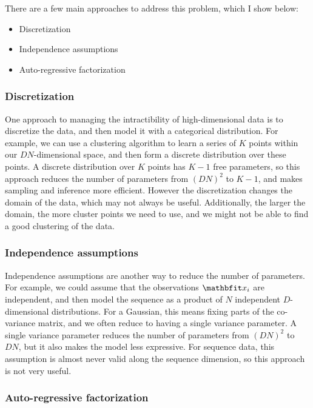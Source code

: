 There are a few main approaches to address this problem, which I show below:

\begin{itemize}
    \item Discretization
    \item Independence assumptions
    \item Auto-regressive factorization
\end{itemize}

\subsubsection{Discretization}

One approach to managing the intractibility of high-dimensional data is to discretize the data, and then model it with a categorical distribution. For example, we can use a clustering algorithm to learn a series of $K$ points within our $DN$-dimensional space, and then form a discrete distribution over these points. A discrete distribution over $K$ points has $K-1$ free parameters, so this approach reduces the number of parameters from $(DN)^2$ to $K-1$, and makes sampling and inference more efficient. However the discretization changes the domain of the data, which may not always be useful. Additionally, the larger the domain, the more cluster points we need to use, and we might not be able to find a good clustering of the data.

\subsubsection{Independence assumptions}

Independence assumptions are another way to reduce the number of parameters. For example, we could assume that the observations $\x_i$ are independent, and then model the sequence as a product of $N$ independent $D$-dimensional distributions. For a Gaussian, this means fixing parts of the co-variance matrix, and we often reduce to having a single variance parameter. A single variance parameter reduces the number of parameters from $(DN)^2$ to $DN$, but it also makes the model less expressive. For sequence data, this assumption is almost never valid along the sequence dimension, so this approach is not very useful.

\subsubsection{Auto-regressive factorization}

